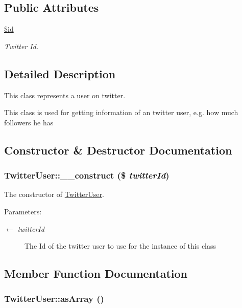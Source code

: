 \subsection*{Public Attributes}
\begin{CompactItemize}
\item 
\hyperlink{class_twitter_user_4096acd6dd8fdc48d8d3523807fb3bef}{\$id}
\begin{CompactList}\small\item\em Twitter Id. \item\end{CompactList}\end{CompactItemize}


\subsection{Detailed Description}
This class represents a user on twitter. 

This class is used for getting information of an twitter user, e.g. how much followers he has 

\subsection{Constructor \& Destructor Documentation}
\hypertarget{class_twitter_user_ac09b350e318425625ba5766fdd28118}{
\subsubsection[{\_\-\_\-construct}]{\setlength{\rightskip}{0pt plus 5cm}TwitterUser::\_\-\_\-construct (\$ {\em twitterId})}}
\label{class_twitter_user_ac09b350e318425625ba5766fdd28118}


The constructor of \hyperlink{class_twitter_user}{TwitterUser}. 

\begin{Desc}
\item[Parameters:]
\begin{description}
\item[\mbox{$\leftarrow$} {\em twitterId}]The Id of the twitter user to use for the instance of this class \end{description}
\end{Desc}


\subsection{Member Function Documentation}
\hypertarget{class_twitter_user_0badd8e7ffdf4e7c30f4954d782efc21}{
\subsubsection[{asArray}]{\setlength{\rightskip}{0pt plus 5cm}TwitterUser::asArray ()}}
\label{class_twitter_user_0badd8e7ffdf4e7c30f4954d782efc21}


